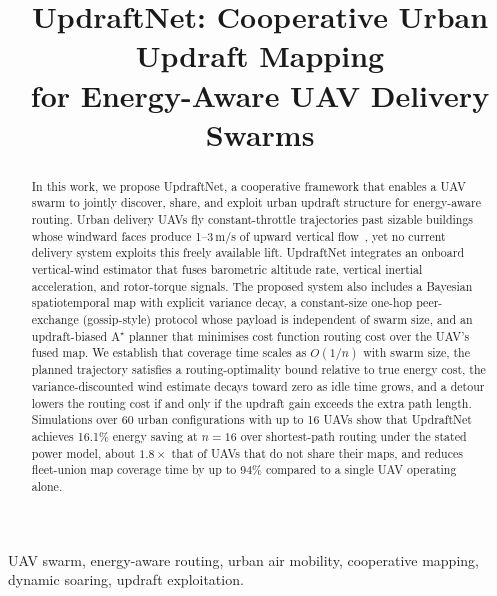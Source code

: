 \documentclass[conference]{IEEEtran}
\newcommand{\rd}[1]{#1}   %
\begin{document}
\title{UpdraftNet: Cooperative Urban Updraft Mapping\\
       for Energy-Aware UAV Delivery Swarms}

\author{
}

\maketitle

\begin{abstract}
In this work, we propose UpdraftNet, a cooperative framework that enables
a UAV swarm to jointly discover, share, and exploit urban updraft structure
for energy-aware routing. Urban delivery UAVs fly constant-throttle
trajectories past sizable buildings whose windward faces produce 1--3\,m/s
of upward vertical flow~\cite{holmes,asce,kawamura}, yet no current delivery
system exploits this freely available lift. UpdraftNet integrates
an onboard vertical-wind estimator that fuses barometric altitude
rate, vertical inertial acceleration, and rotor-torque signals. The
proposed system also includes a Bayesian spatiotemporal map
with explicit variance decay, a constant-size \rd{one-hop peer-exchange (gossip-style) protocol whose payload is
independent of swarm size}, and an updraft-biased A$^\star$ planner that minimises cost function routing cost
over the \rd{UAV's fused} map. We establish that coverage time scales
as $O(1/n)$ with swarm size, the planned trajectory satisfies
a routing-optimality bound relative to true energy cost, the
variance-discounted wind estimate decays toward zero as idle
time grows, and a detour \rd{lowers the routing cost} if and only if the
updraft gain exceeds the extra path length. Simulations over 60
urban configurations with up to 16 UAVs show that UpdraftNet
achieves \rd{16.1\% energy saving at $n=16$ over shortest-path routing under the stated power model, about $1.8\times$ that of UAVs that do not share their maps,} and reduces \rd{fleet-union} map coverage time by up to \rd{94\%} compared to a
single UAV operating alone.
\end{abstract}
\begin{IEEEkeywords}
UAV swarm, energy-aware routing, urban air
mobility, cooperative mapping, dynamic soaring, updraft exploitation.
\end{IEEEkeywords}
\end{document}
